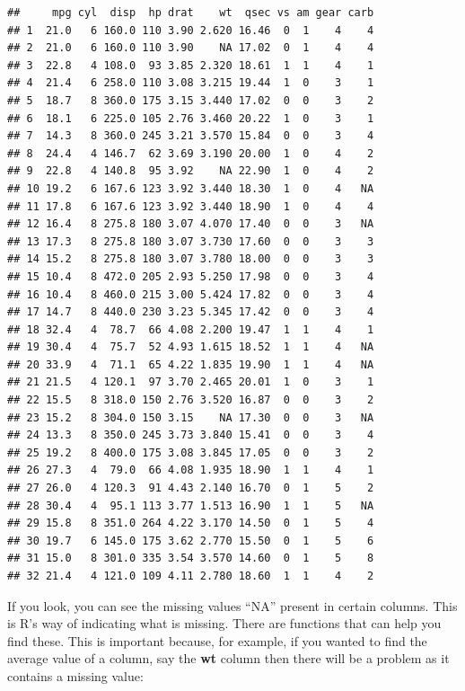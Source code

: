 \documentclass[]{book}
\newenvironment{Shaded}{\begin{snugshade}}{\end{snugshade}}
\newcommand{\KeywordTok}[1]{\textcolor[rgb]{0.13,0.29,0.53}{\textbf{#1}}}
\newcommand{\NormalTok}[1]{#1}
\newcommand{\OperatorTok}[1]{\textcolor[rgb]{0.81,0.36,0.00}{\textbf{#1}}}
\begin{document}
\begin{verbatim}
##     mpg cyl  disp  hp drat    wt  qsec vs am gear carb
## 1  21.0   6 160.0 110 3.90 2.620 16.46  0  1    4    4
## 2  21.0   6 160.0 110 3.90    NA 17.02  0  1    4    4
## 3  22.8   4 108.0  93 3.85 2.320 18.61  1  1    4    1
## 4  21.4   6 258.0 110 3.08 3.215 19.44  1  0    3    1
## 5  18.7   8 360.0 175 3.15 3.440 17.02  0  0    3    2
## 6  18.1   6 225.0 105 2.76 3.460 20.22  1  0    3    1
## 7  14.3   8 360.0 245 3.21 3.570 15.84  0  0    3    4
## 8  24.4   4 146.7  62 3.69 3.190 20.00  1  0    4    2
## 9  22.8   4 140.8  95 3.92    NA 22.90  1  0    4    2
## 10 19.2   6 167.6 123 3.92 3.440 18.30  1  0    4   NA
## 11 17.8   6 167.6 123 3.92 3.440 18.90  1  0    4    4
## 12 16.4   8 275.8 180 3.07 4.070 17.40  0  0    3   NA
## 13 17.3   8 275.8 180 3.07 3.730 17.60  0  0    3    3
## 14 15.2   8 275.8 180 3.07 3.780 18.00  0  0    3    3
## 15 10.4   8 472.0 205 2.93 5.250 17.98  0  0    3    4
## 16 10.4   8 460.0 215 3.00 5.424 17.82  0  0    3    4
## 17 14.7   8 440.0 230 3.23 5.345 17.42  0  0    3    4
## 18 32.4   4  78.7  66 4.08 2.200 19.47  1  1    4    1
## 19 30.4   4  75.7  52 4.93 1.615 18.52  1  1    4   NA
## 20 33.9   4  71.1  65 4.22 1.835 19.90  1  1    4   NA
## 21 21.5   4 120.1  97 3.70 2.465 20.01  1  0    3    1
## 22 15.5   8 318.0 150 2.76 3.520 16.87  0  0    3    2
## 23 15.2   8 304.0 150 3.15    NA 17.30  0  0    3   NA
## 24 13.3   8 350.0 245 3.73 3.840 15.41  0  0    3    4
## 25 19.2   8 400.0 175 3.08 3.845 17.05  0  0    3    2
## 26 27.3   4  79.0  66 4.08 1.935 18.90  1  1    4    1
## 27 26.0   4 120.3  91 4.43 2.140 16.70  0  1    5    2
## 28 30.4   4  95.1 113 3.77 1.513 16.90  1  1    5   NA
## 29 15.8   8 351.0 264 4.22 3.170 14.50  0  1    5    4
## 30 19.7   6 145.0 175 3.62 2.770 15.50  0  1    5    6
## 31 15.0   8 301.0 335 3.54 3.570 14.60  0  1    5    8
## 32 21.4   4 121.0 109 4.11 2.780 18.60  1  1    4    2
\end{verbatim}

If you look, you can see the missing values ``NA'' present in certain columns. This is R's way of indicating what is missing. There are functions that can help you find these. This is important because, for example, if you wanted to find the average value of a column, say the \textbf{wt} column then there will be a problem as it contains a missing value:

\begin{Shaded}
\end{Shaded}
\end{document}
